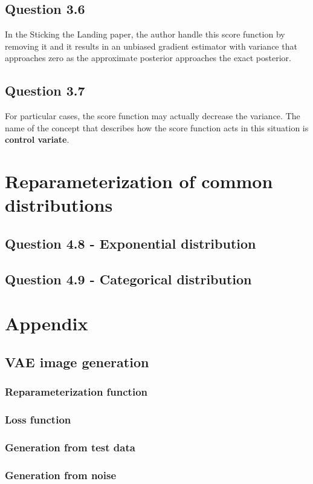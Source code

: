 \documentclass{article}
\begin{document}
\subsection{Question 3.6}
In the Sticking the Landing paper, the author handle this score function by removing it and it results in an unbiased gradient estimator with variance that approaches zero as the approximate posterior approaches the exact posterior.

\subsection{Question 3.7}
For particular cases, the score function may actually decrease the variance. The name of the concept that describes how the score function acts in this situation is \textbf{control variate}.

\section{Reparameterization of common distributions}
\subsection{Question 4.8 - Exponential distribution}

\subsection{Question 4.9 - Categorical distribution}

\newpage
\appendix

\section{Appendix}
\subsection{VAE image generation}\label{appendix:1.2}
\subsubsection{Reparameterization function}\label{appendix:1.2-reparam}

\subsubsection{Loss function}\label{appendix:1.2-loss}

\subsubsection{Generation from test data}\label{appendix:1.2-gen_test}

\subsubsection{Generation from noise}\label{appendix:1.2-gen}

\end{document}
